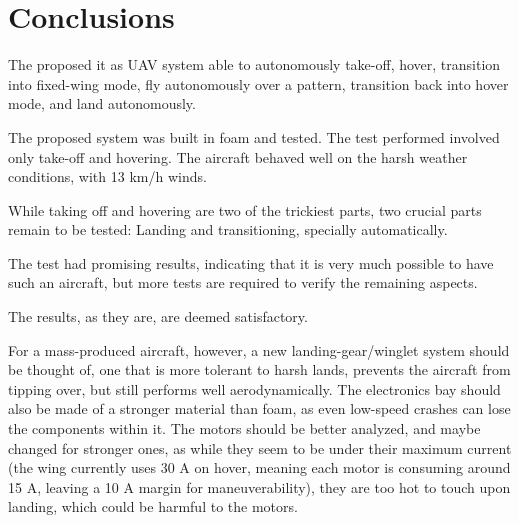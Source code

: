 \chapter{Conclusions} \label{chap:conclusions}

The proposed it as UAV system able to autonomously take-off, hover, transition into fixed-wing mode, fly autonomously over a pattern, transition back into hover mode, and land autonomously.

The proposed system was built in foam and tested.
The test performed involved only take-off and hovering. The aircraft behaved well on the harsh weather conditions, with 13 km/h winds.

While taking off and hovering are two of the trickiest parts, two crucial parts remain to be tested: Landing and transitioning, specially automatically.

The test had promising results, indicating that it is very much possible to have such an aircraft, but more tests are required to verify the remaining aspects.

The results, as they are, are deemed satisfactory.

For a mass-produced aircraft, however, a new landing-gear/winglet system should be thought of, one that is more tolerant to harsh lands, prevents the aircraft from tipping over, but still performs well aerodynamically.
The electronics bay should also be made of a stronger material than foam, as even low-speed crashes can lose the components within it.
The motors should be better analyzed, and maybe changed for stronger ones, as while they seem to be under their maximum current (the wing currently uses 30 A on hover, meaning each motor is consuming around 15 A, leaving a 10 A margin for maneuverability), they are too hot to touch upon landing, which could be harmful to the motors.
